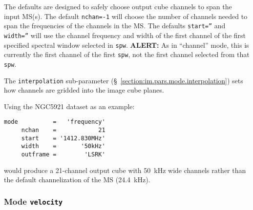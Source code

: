 The defaults are designed to safely choose output cube channels to
span the input MS(s).
The default {\tt nchan=-1} will choose the number of channels needed
to span the frequencies of the channels in the MS.  
The defaults {\tt start=''} and {\tt width=''} will use the channel
frequency and width of the first channel of the first specified
spectral window selected in {\tt spw}.  {\bf ALERT:} As in ``channel''
mode, this is currently the first channel of the first {\tt spw}, not
the first channel selected from that {\tt spw}.  

The {\tt interpolation} sub-parameter
(\S~\ref{section:im.pars.mode.interpolation}) sets how channels are
gridded into the image cube planes.

Using the NGC5921 dataset as an example:
\small
\begin{verbatim}
mode          =   'frequency'       
     nchan    =            21        
     start    = '1412.830MHz'     
     width    =       '50kHz'        
     outframe =        'LSRK'
\end{verbatim}
\normalsize
would produce a 21-channel output cube with 50~kHz wide channels
rather than the default channelization of the MS (24.4~kHz).


\subsubsection{Mode {\tt velocity} }
\label{section:im.pars.mode.velocity}

